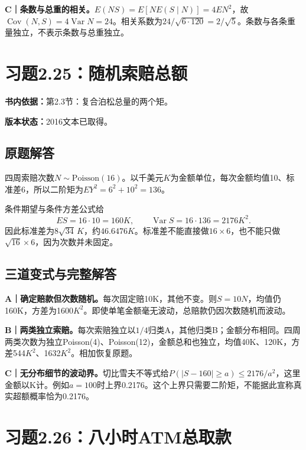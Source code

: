 \documentclass[
  11pt,
  a4paper,
  UTF8,fontset=fandol]{ctexart}
\let\OldSection\section
\renewcommand{\section}{\Needspace{7\baselineskip}\OldSection}
\let\OldSubsection\subsection
\renewcommand{\subsection}{\Needspace{5\baselineskip}\OldSubsection}
\begin{document}
\textbf{C｜条数与总重的相关。}\(E(NS)=E[N E(S\mid N)]=4EN^2\)，故\(\operatorname{Cov}(N,S)=4\operatorname{Var}N=24\)。相关系数为\(24/\sqrt{6\cdot120}=2/\sqrt5\)。条数与各条重量独立，不表示条数与总重独立。

\newpage

\section{习题2.25：随机索赔总额}\label{ux4e60ux98982.25ux968fux673aux7d22ux8d54ux603bux989d}

\textbf{书内依据：}第2.3节：复合泊松总量的两个矩。

\textbf{版本状态：}2016文本已取得。

\subsection{原题解答}\label{ux539fux9898ux89e3ux7b54-24}

四周索赔次数\(N\sim\mathrm{Poisson}(16)\)。以千美元\(K\)为金额单位，每次金额均值10、标准差6，所以二阶矩为\(EY^2=6^2+10^2=136\)。

条件期望与条件方差公式给
\[\boxed{ES=16\cdot10=160K},\qquad \operatorname{Var}S=16\cdot136=2176K^2.\]
因此标准差为\(\boxed{8\sqrt{34}\,K}\)，约\(46.6476K\)。标准差不能直接做\(16\times6\)，也不能只做\(\sqrt{16}\times6\)，因为次数并未固定。

\subsection{三道变式与完整解答}\label{ux4e09ux9053ux53d8ux5f0fux4e0eux5b8cux6574ux89e3ux7b54-24}

\textbf{A｜确定赔款但次数随机。}每次固定赔10K，其他不变。则\(S=10N\)，均值仍160K，方差为1600\(K^2\)。即使单笔金额毫无波动，总赔款仍因次数随机而波动。

\textbf{B｜两类独立索赔。}每次索赔独立以\(1/4\)归类A，其他归类B；金额分布相同。四周两类次数为独立Poisson(4)、Poisson(12)，金额总和也独立，均值40K、120K，方差544\(K^2\)、1632\(K^2\)。相加恢复原题。

\textbf{C｜无分布细节的波动界。}切比雪夫不等式给\(P(|S-160|\ge a)\le2176/a^2\)，这里金额以K计。例如\(a=100\)时上界0.2176。这个上界只需要二阶矩，不能据此宣称真实超额概率恰为0.2176。

\newpage

\section{习题2.26：八小时ATM总取款}\label{ux4e60ux98982.26ux516bux5c0fux65f6atmux603bux53d6ux6b3e}
\end{document}
